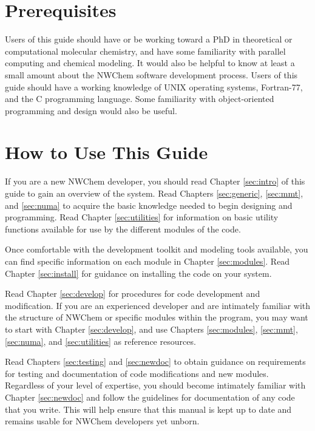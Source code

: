 \section*{Prerequisites}

Users of this guide should have or be working toward a PhD in theoretical or
computational molecular chemistry,
and have some familiarity with parallel computing and chemical modeling.  
It would also be helpful to know at least a small amount about the NWChem software 
development process.  Users of this guide should have a working knowledge of UNIX 
operating systems, Fortran-77, and the C programming language.  Some familiarity 
with object-oriented programming and design would also be useful.

\section*{How to Use This Guide}

If you are a new NWChem developer, you should read Chapter \ref{sec:intro}
of this guide to gain an overview of the system.  Read Chapters \ref{sec:generic},
\ref{sec:mmt}, and \ref{sec:numa} to acquire the basic knowledge needed to begin designing 
and programming.  Read Chapter \ref{sec:utilities} for information on basic utility
functions available for use by the different modules of the code.

Once comfortable with the development toolkit and modeling
tools available, you can find specific information on each module in Chapter
\ref{sec:modules}.  Read Chapter \ref{sec:install} for guidance on installing the 
code on your system.  

Read Chapter \ref{sec:develop} for procedures for code
development and modification.
If you are an experienced developer and are intimately familiar with the structure 
of NWChem or specific modules within the program, you may want to start with 
Chapter \ref{sec:develop}, and use Chapters \ref{sec:modules}, 
\ref{sec:mmt}, \ref{sec:numa}, and \ref{sec:utilities}
as reference resources.

Read Chapters \ref{sec:testing} and \ref{sec:newdoc} to obtain guidance on requirements
for testing and documentation of code modifications and new modules.
Regardless of your level of expertise, you should become 
intimately familiar with Chapter \ref{sec:newdoc}
and follow the guidelines for documentation of any code that you write.  This
will help ensure that this manual is kept up to date and remains usable for
NWChem developers yet unborn.

